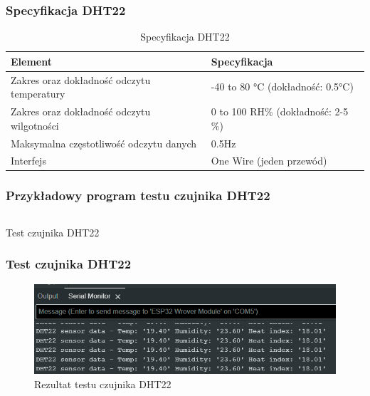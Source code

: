\documentclass[12pt,a4paper]{article}
\begin{document}
\subsubsection{Specyfikacja DHT22}

\begin{table}[H]
    \centering
    \begin{tabular}{|l|l|}
        \hline
        Element & Specyfikacja \\
        \hline
        Zakres oraz dokładność odczytu temperatury & -40 to 80 °C (dokładność: 0.5°C) \\
        \hline
        Zakres oraz dokładność odczytu wilgotności & 0 to 100 RH\% (dokładność: 2-5 \%) \\
        \hline
        Maksymalna częstotliwość odczytu danych & 0.5Hz \\
        \hline
        Interfejs & One Wire (jeden przewód) \\
        \hline
    \end{tabular}
    \caption{Specyfikacja DHT22}
    \label{dht22-spec}
\end{table}

\subsubsection{Przykładowy program testu czujnika DHT22}

\begin{code}[H]
\inputminted[frame=lines,baselinestretch=1,breaklines,linenos,xleftmargin=1.5em]{c}{../proj/dht22-test/dht22-test.ino}

\caption{Test czujnika DHT22}
\end{code}

\subsubsection{Test czujnika DHT22}
\begin{figure}[H]
    \centering
    \includegraphics[width=\textwidth]{dht22-test.png}
    \caption{Rezultat testu czujnika DHT22}
\end{figure}
\end{document}
